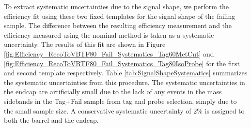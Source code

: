To extract systematic uncertainties due to the signal shape, we perform the efficiency fit using these two fixed templates for the signal shape
of the failing sample. The difference between the resulting efficiency measurement and the efficiency measured using the nominal method is taken as a systematic uncertainty. The results of this fit are shown in Figure \ref{fig:Efficiency_RecoToVBTF80_Fail_Systematics_Tag60MetCut} and \ref{fig:Efficiency_RecoToVBTF80_Fail_Systematics_Tag80IsoProbe} for the first and second template respectively. Table \ref{tab:SignalShapeSystematics} summarizes the systematic uncertainties from this procedure. The systematic uncertainties in the endcap are artificially small due to the lack of any events in the mass sidebands in the Tag+Fail sample from tag and probe selection, simply due to the small sample size. A conservative systematic uncertainty of $2\%$ is assigned to both the barrel and the endcap.

